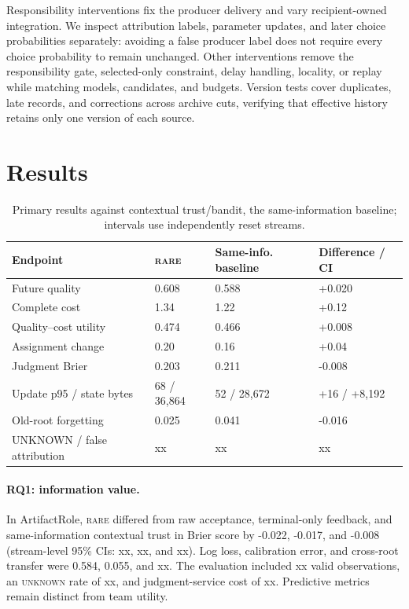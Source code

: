 \documentclass[sigconf,anonymous]{aamas}
\newcommand{\rare}{\textsc{rare}}
\newcommand{\unknown}{\textsc{unknown}}
\begin{document}
Responsibility interventions fix the producer delivery and vary recipient-owned integration. We inspect attribution labels, parameter updates, and later choice probabilities separately: avoiding a false producer label does not require every choice probability to remain unchanged. Other interventions remove the responsibility gate, selected-only constraint, delay handling, locality, or replay while matching models, candidates, and budgets. Version tests cover duplicates, late records, and corrections across archive cuts, verifying that effective history retains only one version of each source.

\section{Results}
\begin{table}[t]
\centering\small
\setlength{\tabcolsep}{2.2pt}
\begin{tabular}{p{}p{}p{}p{}}
\toprule
Endpoint & \rare{} & Same-info. baseline & Difference / CI \\
\midrule
Future quality & 0.608 & 0.588 & +0.020 \\
Complete cost & 1.34 & 1.22 & +0.12 \\
Quality--cost utility & 0.474 & 0.466 & +0.008 \\
Assignment change & 0.20 & 0.16 & +0.04 \\
Judgment Brier & 0.203 & 0.211 & -0.008 \\
Update p95 / state bytes & 68 / 36,864 & 52 / 28,672 & +16 / +8,192 \\
Old-root forgetting & 0.025 & 0.041 & -0.016 \\
UNKNOWN / false attribution & xx & xx & xx \\
\bottomrule
\end{tabular}
\caption{Primary results against contextual trust/bandit, the same-information baseline; intervals use independently reset streams.}
\label{tab:results}
\end{table}

\paragraph{RQ1: information value.} In ArtifactRole, \rare{} differed from raw acceptance, terminal-only feedback, and same-information contextual trust in Brier score by -0.022, -0.017, and -0.008 (stream-level 95\% CIs: xx, xx, and xx). Log loss, calibration error, and cross-root transfer were 0.584, 0.055, and xx. The evaluation included xx valid observations, an \unknown{} rate of xx, and judgment-service cost of xx. Predictive metrics remain distinct from team utility.
\end{document}
